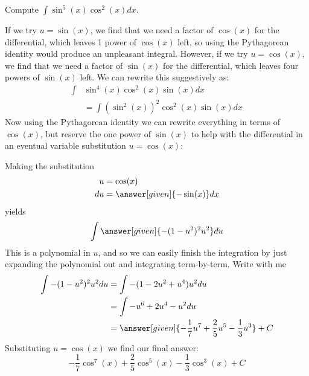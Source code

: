 \documentclass{ximera}
\begin{document}
\begin{example}
  Compute $\int \sin^{5}(x) \cos^2(x) dx$.

  \begin{explanation}
   
    If we try $u=\sin(x)$, we find that we need a factor of $\cos(x)$ for the differential, which leaves 1 power of $\cos(x)$ left, so using the Pythagorean identity would produce an unpleasant integral.  However, if we try $u=\cos(x)$, we find that we need a factor of $\sin(x)$ for the differential, which leaves four powers of $\sin(x)$ left.    We can rewrite this suggestively as:
    \begin{align*}
    \int &\sin^4(x) \cos^2(x) \sin(x) dx \\
    &= \int (\sin^2(x))^2 \cos^2(x) \sin(x) dx
    \end{align*}
    Now using the Pythagorean identity we can rewrite everything in
    terms of $\cos(x)$, but reserve the one power of $\sin(x)$ to help
    with the differential in an eventual variable substitution $u=\cos(x)$:
    \begin{center}%
    \end{center}
    Making the substitution
    \begin{align*}
      u &= \cos(x)\\
      du &=\answer[given]{-\sin(x)} dx
    \end{align*}
    yields
    \[
    \int \answer[given]{-(1-u^2)^2 u^2} du
    \]
    This is a polynomial in $u$, and so we can easily finish the
    integration by just expanding the polynomial out and integrating
    term-by-term. Write with me
    \begin{align*}
      \int {-(1-u^2)^2 u^2} du &= \int -(1-2u^2+u^4)u^2du\\
      &= \int-u^6 + 2u^4-u^2 du\\
      &=\answer[given]{-\frac{1}{7}u^7 + \frac{2}{5}u^5 -\frac{1}{3} u^3}+C
    \end{align*}
    Substituting $u = \cos(x)$ we find our final answer:
    \[
    -\frac{1}{7}\cos^7(x) + \frac{2}{5}\cos^5(x) - \frac{1}{3} \cos^3(x)+C
    \]
  \end{explanation}
\end{example}
\end{document}

